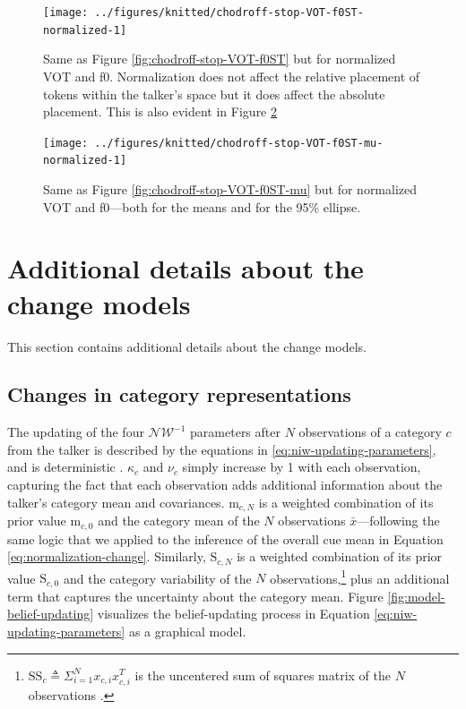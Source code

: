 \documentclass[
  11pt,
  man,floatsintext]{apa6}
\begin{document}
\begin{figure}

{\centering \texttt{[image: ../figures/knitted/chodroff-stop-VOT-f0ST-normalized-1]} 

}

\caption{Same as Figure \ref{fig:chodroff-stop-VOT-f0ST} but for normalized VOT and f0. Normalization does not affect the relative placement of tokens within the talker's space but it does affect the absolute placement. This is also evident in Figure \ref{fig:chodroff-stop-VOT-f0ST-mu-normalized}}\label{fig:chodroff-stop-VOT-f0ST-normalized}
\end{figure}



\begin{figure}

{\centering \texttt{[image: ../figures/knitted/chodroff-stop-VOT-f0ST-mu-normalized-1]} 

}

\caption{Same as Figure \ref{fig:chodroff-stop-VOT-f0ST-mu} but for normalized VOT and f0---both for the means and for the 95\% ellipse.}\label{fig:chodroff-stop-VOT-f0ST-mu-normalized}
\end{figure}

\section{Additional details about the change models}\label{sec:SI-models}

This section contains additional details about the change models.

\subsection{Changes in category representations}\label{sec:SI-models-changes-in-representations}

The updating of the four \(\mathcal{NW^{-1}}\) parameters after \(N\) observations of a category \(c\) from the talker is described by the equations in \eqref{eq:niw-updating-parameters}, and is deterministic \autocite[for details and derivation, see][p.~134]{murphy2012}. \(\kappa_c\) and \(\nu_c\) simply increase by 1 with each observation, capturing the fact that each observation adds additional information about the talker's category mean and covariances. \(\mathrm{m}_{c,N}\) is a weighted combination of its prior value \(\mathrm{m}_{c,0}\) and the category mean of the \(N\) observations \(\bar{x}\)---following the same logic that we applied to the inference of the overall cue mean in Equation \eqref{eq:normalization-change}. Similarly, \(\mathrm{S}_{c,N}\) is a weighted combination of its prior value \(\mathrm{S}_{c,0}\) and the category variability of the \(N\) observations,\footnote{\(\mathrm{SS}_c \triangleq \Sigma_{i=1}^N x_{c,i} x_{c,i}^T\) is the uncentered sum of squares matrix of the \(N\) observations \autocite{murphy2012}.} plus an additional term that captures the uncertainty about the category mean. Figure \ref{fig:model-belief-updating} visualizes the belief-updating process in Equation \eqref{eq:niw-updating-parameters} as a graphical model.
\end{document}
